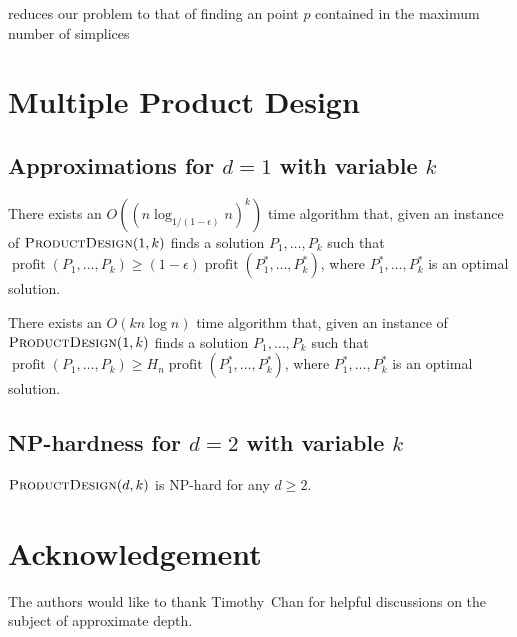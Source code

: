 \documentclass[lotsofwhite]{patmorin}
\newcommand{\val}{\operatorname{profit}}
\newcommand{\eps}{\epsilon}
\begin{document}
 reduces our problem to that of finding an
point $p$ contained in the maximum number of simplices 



\section{Multiple Product Design}

\subsection{Approximations for $d=1$ with variable $k$}

\begin{thm}
There exists an $O((n\log_{1/(1-\eps)} n)^k)$ time algorithm that,
given an instance of $\textsc{ProductDesign}(1,k)$ finds a solution
$P_1,\ldots,P_k$ such that $\val(P_1,\ldots,P_k) \ge
(1-\eps)\val(P_1^*,\ldots,P_k^*)$, where $P_1^*,\ldots,P_k^*$ is
an optimal solution.
\end{thm}


\begin{thm}
There exists an $O(kn\log n)$ time algorithm that,
given an instance of $\textsc{ProductDesign}(1,k)$ finds a solution
$P_1,\ldots,P_k$ such that $\val(P_1,\ldots,P_k) \ge
H_n\val(P_1^*,\ldots,P_k^*)$, where $P_1^*,\ldots,P_k^*$ is
an optimal solution.
\end{thm}

\subsection{NP-hardness for $d=2$ with variable $k$}

\begin{thm}
  $\textsc{ProductDesign}(d,k)$ is NP-hard for any $d\ge 2$.
\end{thm}

\section*{Acknowledgement}

The authors would like to thank Timothy~Chan for helpful discussions
on the subject of approximate depth.
\end{document}
